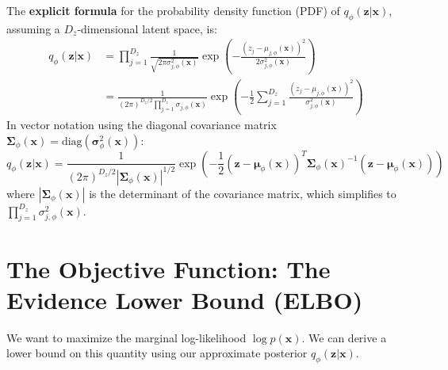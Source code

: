 \documentclass[11pt, letterpaper]{article}
\newcommand{\vx}{\boldsymbol{x}} %
\newcommand{\vz}{\boldsymbol{z}} %
\newcommand{\vmu}{\boldsymbol{\mu}} %
\newcommand{\vsigma}{\boldsymbol{\sigma}} %
\newcommand{\mSigma}{\boldsymbol{\Sigma}} %
\begin{document}
The \textbf{explicit formula} for the probability density function (PDF) of $q_{\phi}(\vz|\vx)$, assuming a $D_z$-dimensional latent space, is:
\begin{align}
    q_{\phi}(\vz|\vx) &= \prod_{j=1}^{D_z} \frac{1}{\sqrt{2\pi \sigma_{j, \phi}^2(\vx)}} \exp\left(-\frac{(z_j - \mu_{j, \phi}(\vx))^2}{2 \sigma_{j, \phi}^2(\vx)}\right) \\
    &= \frac{1}{(2\pi)^{D_z/2} \prod_{j=1}^{D_z} \sigma_{j, \phi}(\vx)} \exp\left(-\frac{1}{2} \sum_{j=1}^{D_z} \frac{(z_j - \mu_{j, \phi}(\vx))^2}{\sigma_{j, \phi}^2(\vx)}\right)
\end{align}
In vector notation using the diagonal covariance matrix $\mSigma_{\phi}(\vx) = \text{diag}(\vsigma^2_{\phi}(\vx))$:
\begin{equation}
    q_{\phi}(\vz|\vx) = \frac{1}{(2\pi)^{D_z/2} |\mSigma_{\phi}(\vx)|^{1/2}} \exp\left(-\frac{1}{2} (\vz - \vmu_{\phi}(\vx))^T \mSigma_{\phi}(\vx)^{-1} (\vz - \vmu_{\phi}(\vx))\right)
\end{equation}
where $|\mSigma_{\phi}(\vx)|$ is the determinant of the covariance matrix, which simplifies to $\prod_{j=1}^{D_z} \sigma_{j, \phi}^2(\vx)$.

\section{The Objective Function: The Evidence Lower Bound (ELBO)}

We want to maximize the marginal log-likelihood $\log p(\vx)$. We can derive a lower bound on this quantity using our approximate posterior $q_{\phi}(\vz|\vx)$.
\end{document}
